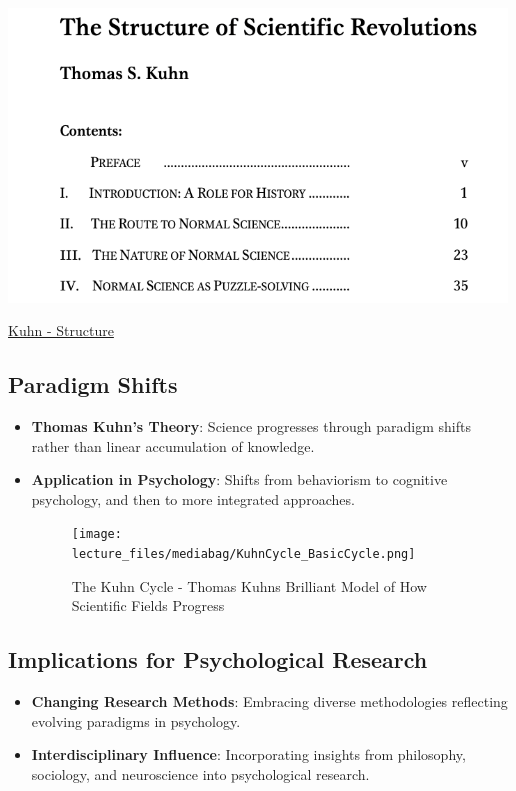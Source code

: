 \documentclass[
  letterpaper,
  DIV=11,
  numbers=noendperiod]{scrartcl}
\providecommand{\tightlist}{%
  \setlength{\itemsep}{0pt}\setlength{\parskip}{0pt}}\usepackage{longtable,booktabs,array}
\begin{document}
\includegraphics[width=5.20833in,height=\textheight]{images/Kuhn.png}

\href{https://folk.ntnu.no/krill/bioko-references/Kuhn\%201962.pdf}{Kuhn
- Structure}

\subsection{Paradigm Shifts}\label{paradigm-shifts}

\begin{itemize}
\item
  \textbf{Thomas Kuhn's Theory}: Science progresses through paradigm
  shifts rather than linear accumulation of knowledge.
\item
  \textbf{Application in Psychology}: Shifts from behaviorism to
  cognitive psychology, and then to more integrated approaches.

  \begin{figure}[H]

  {\centering \texttt{[image: lecture\_files/mediabag/KuhnCycle\_BasicCycle.png]}

  }

  \caption{The Kuhn Cycle - Thomas Kuhn\textquotesingle s Brilliant
  Model of How Scientific Fields Progress}

  \end{figure}%
\end{itemize}

\subsection{Implications for Psychological
Research}\label{implications-for-psychological-research}

\begin{itemize}
\tightlist
\item
  \textbf{Changing Research Methods}: Embracing diverse methodologies
  reflecting evolving paradigms in psychology.
\item
  \textbf{Interdisciplinary Influence}: Incorporating insights from
  philosophy, sociology, and neuroscience into psychological research.
\end{itemize}
\end{document}
